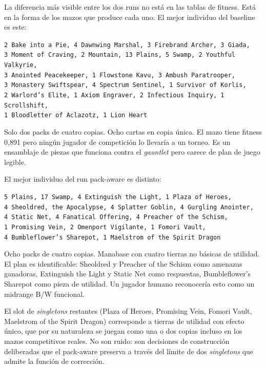 La diferencia más visible entre los dos runs no está en las tablas de fitness. Está en la forma de los mazos que produce cada uno. El mejor individuo del baseline es este:

\begin{center}
\small
\texttt{2 Bake into a Pie, 4 Dawnwing Marshal, 3 Firebrand Archer, 3 Giada,}\\
\texttt{3 Moment of Craving, 2 Mountain, 13 Plains, 5 Swamp, 2 Youthful Valkyrie,}\\
\texttt{3 Anointed Peacekeeper, 1 Flowstone Kavu, 3 Ambush Paratrooper,}\\
\texttt{3 Monastery Swiftspear, 4 Spectrum Sentinel, 1 Survivor of Korlis,}\\
\texttt{2 Warlord's Elite, 1 Axiom Engraver, 2 Infectious Inquiry, 1 Scrollshift,}\\
\texttt{1 Bloodletter of Aclazotz, 1 Lion Heart}
\end{center}

Solo dos packs de cuatro copias. Ocho cartas en copia única. El mazo tiene fitness 0,891 pero ningún jugador de competición lo llevaría a un torneo. Es un ensamblaje de piezas que funciona contra el \emph{gauntlet} pero carece de plan de juego legible.

El mejor individuo del run pack-aware es distinto:

\begin{center}
\small
\texttt{5 Plains, 17 Swamp, 4 Extinguish the Light, 1 Plaza of Heroes,}\\
\texttt{4 Sheoldred, the Apocalypse, 4 Splatter Goblin, 4 Gurgling Anointer,}\\
\texttt{4 Static Net, 4 Fanatical Offering, 4 Preacher of the Schism,}\\
\texttt{1 Promising Vein, 2 Omenport Vigilante, 1 Fomori Vault,}\\
\texttt{4 Bumbleflower's Sharepot, 1 Maelstrom of the Spirit Dragon}
\end{center}

Ocho packs de cuatro copias. Manabase con cuatro tierras no básicas de utilidad. El plan es identificable: Sheoldred y Preacher of the Schism como amenazas ganadoras, Extinguish the Light y Static Net como respuestas, Bumbleflower's Sharepot como pieza de utilidad. Un jugador humano reconocería esto como un midrange B/W funcional.

El slot de \emph{singletons} restantes (Plaza of Heroes, Promising Vein, Fomori Vault, Maelstrom of the Spirit Dragon) corresponde a tierras de utilidad con efecto único, que por su naturaleza se juegan como una o dos copias incluso en los mazos competitivos reales. No son ruido: son decisiones de construcción deliberadas que el pack-aware preserva a través del límite de dos \emph{singletons} que admite la función de corrección.

